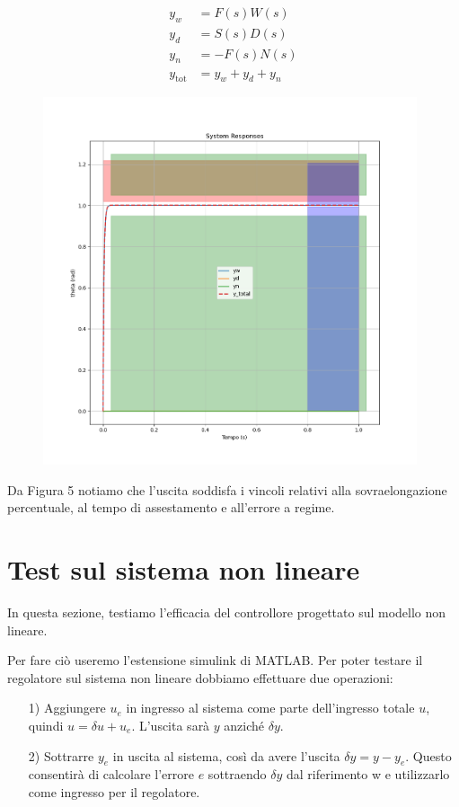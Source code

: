 \documentclass[a4paper, 11pt]{article}
\begin{document}
%
\begin{subequations}\label{eq:system}
\begin{align}
	    y_w &= F(s)W(s)
        \\
        y_d &= S(s)D(s)
        \\
        y_n &= -F(s)N(s)
        \\
        y_{\text{tot}}&= y_w+y_d+y_n
\end{align}
\end{subequations}
%
\begin{figure}[H]
    \centering
\includegraphics[width=110mm]{figs/linear_sim.png}
    \caption{}
    \label{Figura6}
\end{figure}


Da Figura 5 notiamo che l'uscita soddisfa i vincoli relativi alla sovraelongazione percentuale, al tempo di assestamento e all'errore a regime.

\section{Test sul sistema non lineare}

In questa sezione, testiamo l'efficacia del controllore progettato sul modello non lineare.


Per fare ciò useremo l'estensione simulink di MATLAB. Per poter testare il regolatore sul sistema non lineare dobbiamo effettuare due operazioni:

\begin{itemize}
	\item[1)] Aggiungere $u_e$ in ingresso al sistema come parte dell'ingresso totale $u$, quindi $u = \delta u + u_e$. L'uscita sarà $y$ anziché $\delta y$.
 \\
        \item[2)]Sottrarre $y_e$ in uscita al sistema, così da avere l'uscita $\delta y = y - y_e$. Questo consentirà di calcolare l'errore $e$ sottraendo $\delta y$ dal riferimento w e utilizzarlo come ingresso per il regolatore.
\end{itemize}
\end{document}
